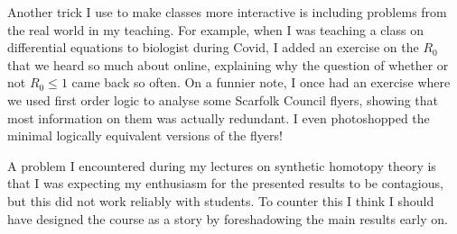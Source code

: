 \documentclass{article}
\begin{document}
Another trick I use to make classes more interactive is including problems from the real world in my teaching. For example, when I was teaching a class on differential equations to biologist during Covid, I added an exercise on the $R_0$ that we heard so much about online, explaining why the question of whether or not $R_0\leq 1$ came back so often. On a funnier note, I once had an exercise where we used first order logic to analyse some Scarfolk Council flyers, showing that most information on them was actually redundant. I even photoshopped the minimal logically equivalent versions of the flyers!


A problem I encountered during my lectures on synthetic homotopy theory is that I was expecting my enthusiasm for the presented results to be contagious, but this did not work reliably with students. To counter this I think I should have designed the course as a story by foreshadowing the main results early on. 

\end{document}
